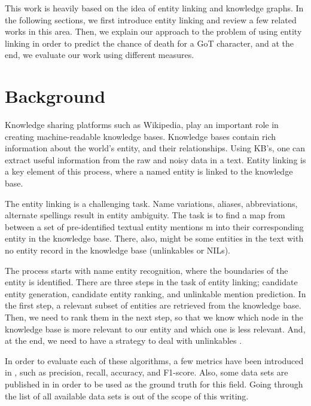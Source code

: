 \documentclass[letterpaper]{article}
\begin{document}
This work is heavily based on the idea of entity linking and knowledge graphs. In the following sections, we first introduce entity linking and review a few related works in this area. Then, we explain our approach to the problem of using entity linking in order to predict the chance of death for a GoT character, and at the end, we evaluate our work using different measures.

\section{Background}

Knowledge sharing platforms such as Wikipedia, play an important role in creating machine-readable knowledge bases. Knowledge bases contain rich information about the world's entity, and their relationships. Using KB's, one can extract useful information from the raw and noisy data in a text. Entity linking is a key element of this process, where a named entity is linked to the knowledge base.

The entity linking is a challenging task. Name variations, aliases, abbreviations, alternate spellings result in entity ambiguity. The task is to find a map from between a set of pre-identified textual entity mentions m into their corresponding entity in the knowledge base. There, also, might be some entities in the text with no entity record in the knowledge base (unlinkables or NILs).

The process starts with name entity recognition, where the boundaries of the entity is identified. There are three steps in the task of entity linking; candidate entity generation, candidate entity ranking, and unlinkable mention prediction. In the first step, a relevant subset of entities are retrieved from the knowledge base. Then, we need to rank them in the next step, so that we know which node in the knowledge base is more relevant to our entity and which one is less relevant. And, at the end, we need to have a strategy to deal with unlinkables \cite{entity}.


In order to evaluate each of these algorithms, a few metrics have been introduced in \cite{entity}, such as precision, recall, accuracy, and F1-score. Also, some data sets are published in \cite{entity} in order to be used as the ground truth for this field. Going through the list of all available data sets is out of the scope of this writing.
\end{document}
